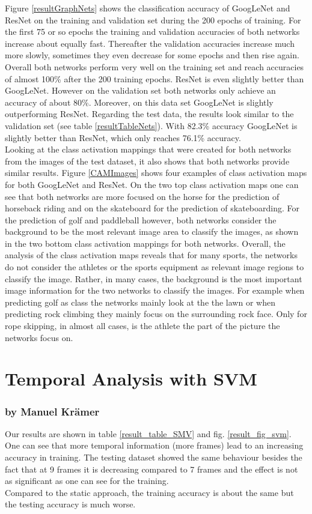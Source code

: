 \documentclass[11pt]{report}
\begin{document}
Figure \ref{resultGraphNets} shows the classification accuracy of GoogLeNet and
ResNet on the training and validation set during the 200 epochs of training.
For the first 75 or so epochs the training
and validation accuracies of both networks increase about equally fast.
Thereafter the validation accuracies increase much more slowly, sometimes they
even decrease for some epochs and then rise again. Overall both networks perform
very well on the training set and reach accuracies of almost 100\% after the 200
training epochs.
ResNet is even slightly better than GoogLeNet. However on the validation set
both networks only achieve an accuracy of about 80\%. Moreover, on this data
set GoogLeNet is slightly outperforming ResNet. Regarding the test data, the
results look similar to the validation set (see table \ref{resultTableNets}).
With 82.3\% accuracy GoogLeNet is slightly better than ResNet, which only
reaches 76.1\% accuracy. \\
Looking at the class activation mappings that were created for both networks from the images of the
test dataset, it also shows that both networks provide similar results. Figure
\ref{CAMImages} shows four examples of class activation maps for both GoogLeNet and ResNet. On
the two top class activation maps one can see that both networks are more
focused on the horse for the prediction of horseback riding and on the
skateboard for the prediction of skateboarding. For the prediction of golf and
paddleball however, both networks consider the background to be the most
relevant image area to classify the images, as shown in the two bottom class
activation mappings for both networks. Overall, the analysis of the class
activation maps
reveals that for many sports, the networks do not consider the athletes or the
sports equipment as relevant image regions to classify the image. Rather, in
many cases, the background is the most important image information for the two
networks to classify the images. For example when predicting golf as class the
networks mainly look at the the lawn or when predicting rock climbing they
mainly focus on the surrounding rock face. Only for rope skipping, in almost
all cases, is the athlete the part of the picture the networks focus on.

\section{Temporal Analysis with SVM}
\subsubsection{by Manuel Krämer}
Our results are shown in table \ref{result_table_SMV} and fig. \ref{result_fig_svm}.
One can see that more temporal information (more frames) lead to an increasing accuracy in training. The testing dataset showed the same behaviour besides the fact that at 9 frames it is decreasing compared to 7 frames and the effect is not as significant as one can see for the training.\\
Compared to the static approach, the training accuracy is about the same but the testing accuracy is much worse.
\end{document}
